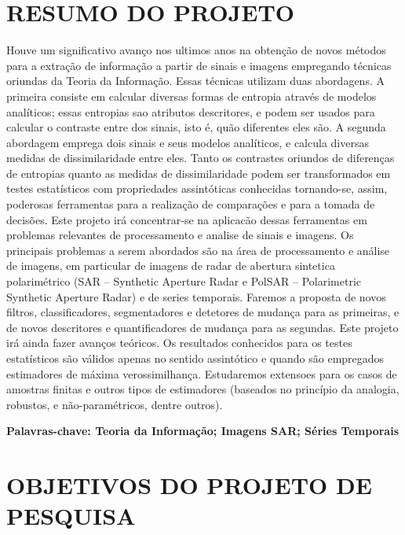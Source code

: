 \documentclass[12pt]{article}
\begin{document}
\hrulefill   


\newpage
\section*{\centering \textbf{RESUMO DO PROJETO}}

\vspace{0.2cm}

Houve um significativo avanço nos ultimos anos na obtenção de novos métodos para a extração de informação a partir de sinais e imagens empregando técnicas oriundas da Teoria da Informação. 
Essas técnicas utilizam duas abordagens. 
A primeira consiste em calcular diversas formas de entropia através de modelos analíticos; essas entropias sao atributos descritores, e podem ser usados para calcular o contraste entre dos sinais, isto é, quão diferentes eles são. 
A segunda abordagem emprega dois sinais e seus modelos analíticos, e calcula diversas medidas de dissimilaridade entre eles. 
Tanto os contrastes oriundos de diferenças de entropias quanto as medidas de dissimilaridade podem ser transformados em testes estatísticos com propriedades assintóticas conhecidas tornando-se, assim, poderosas ferramentas para a realização de comparações e para a tomada de decisões. 
Este projeto irá concentrar-se na aplicacão dessas ferramentas em problemas relevantes de processamento e analise de sinais e imagens. 
Os principais problemas a serem abordados são na área de processamento e análise de imagens, em particular de imagens de radar de abertura sintetica polarimétrico (SAR -- Synthetic Aperture Radar e PolSAR -- Polarimetric
Synthetic Aperture Radar) e de series temporais. 
Faremos a proposta de novos filtros, classificadores, segmentadores e detetores de mudança para as primeiras, e de novos descritores e quantificadores de mudança para as segundas. Este projeto irá ainda fazer avanços teóricos. 
Os resultados conhecidos para os testes estatísticos são válidos apenas no sentido assintótico e quando são empregados estimadores de máxima verossimilhança. 
Estudaremos extensoes para os casos de amostras finitas e outros tipos de estimadores (baseados no princípio da analogia, robustos, e não-paramétricos, dentre outros).


\textbf{Palavras-chave: Teoria da Informação; Imagens SAR; Séries Temporais} 


\newpage
\section*{\centering \textbf{OBJETIVOS DO PROJETO DE PESQUISA}}
\end{document}
